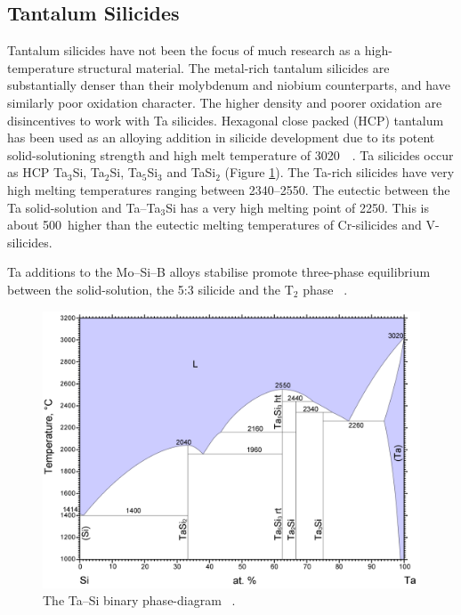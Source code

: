 \subsection{Tantalum Silicides}

Tantalum silicides have not been the focus of much research as a high-temperature structural material.  The metal-rich tantalum silicides are substantially denser than their molybdenum and niobium counterparts, and have similarly poor oxidation character.  The higher density and poorer oxidation are disincentives to work with Ta silicides.  Hexagonal close packed (HCP) tantalum has been used as an alloying addition in silicide development due to its potent solid-solutioning strength and high melt temperature of 3020\celsius\ ~\cite{schlesinger94, naidu90ta}.  Ta silicides occur as HCP Ta$_3$Si, Ta$_2$Si, Ta$_5$Si$_3$ and TaSi$_2$ (Figure \ref{fig:TaSi}).  The Ta-rich silicides have very high melting temperatures ranging between 2340--2550\celsius.  The eutectic between the Ta solid-solution and Ta--Ta$_3$Si has a very high melting point of 2250\celsius.  This is about 500\celsius\ higher than the eutectic melting temperatures of Cr-silicides and V-silicides.  

Ta additions to the Mo--Si--B alloys stabilise promote three-phase equilibrium between the solid-solution, the 5:3 silicide and the T$_2$ phase ~\cite{sakidja08}.

%
\begin{figure}[H]
\begin{center}
\includegraphics[width=12cm]{TaSi}
\caption{The Ta--Si binary phase-diagram ~\cite{naidu90ta}.}\label{fig:TaSi}
\end{center}
\end{figure}

